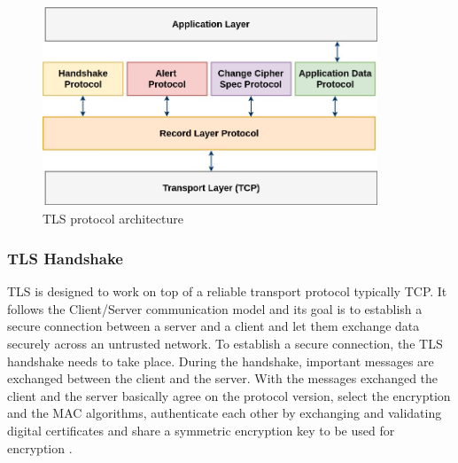 \begin{figure}[H]
\centering
\includegraphics[width=10cm,height=6cm]{figures/dtls/tls-protocol-architecture.jpg}
\caption{TLS protocol architecture}\label{tls-protocol-architecture}
\end{figure}

\subsubsection{\ac{TLS} Handshake}

\ac{TLS} is designed to work on top of a reliable transport protocol typically \ac{TCP}. It follows the Client/Server
communication model and its goal is to establish a secure connection between a server and a client
and let them exchange data securely across an untrusted network. To establish a secure connection, the \ac{TLS} handshake needs to take
place. During the handshake, important messages are exchanged between the client and the server. With the messages exchanged
the client and the server basically agree on the protocol version, select the encryption and the MAC algorithms,
authenticate each other by exchanging and validating digital certificates and share a symmetric encryption key to be used
for encryption \cite{rfc5246}.

